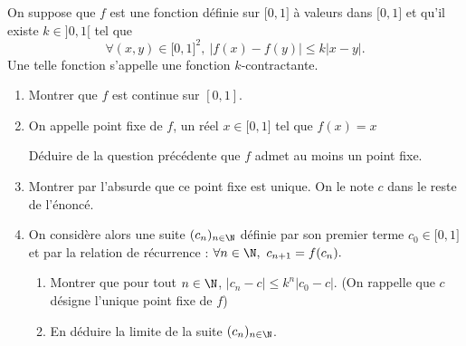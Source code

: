 \documentclass[a4paper, 11pt,reqno]{article}
\begin{document}
\vspace{1.5cm}





\begin{exercice}  \;
\noindent On suppose que $f$ est une fonction d\'efinie sur $\lbrack 0,1\rbrack$ \`a valeurs dans $\lbrack 0,1\rbrack$ et qu'il existe $k\in\rbrack 0,1\lbrack$ tel que
$$\forall (x,y)\in\lbrack 0,1\rbrack^2,\ |f(x)-f(y)|\leq k|x-y|.$$
Une telle fonction s'appelle une fonction $k$-contractante.
\begin{enumerate}
\item Montrer que $f$ est continue sur $[0,1]$. 
\item On appelle point fixe de  $f$,  un réel  $x \in \lbrack 0,1\rbrack$ tel que 
$f(x)=x$

Déduire de la question précédente que  $f$ admet au moins un point fixe.

\item Montrer par l'absurde que ce point fixe est unique. On le note $c$ dans le reste de l'énoncé.  

\item 
On consid\`ere alors une suite $(c_n)_{n\in\N}$ d\'efinie par son premier terme $c_0\in\lbrack 0,1\rbrack$ et par la relation de r\'ecurrence  : $\forall n\in\N,\ c_{n+1}=f(c_n).$
\begin{enumerate}
\item Montrer que pour tout $n\in\N$, $|c_n-c|\leq k^n|c_0-c|$.  (On rappelle que $c$ désigne l'unique point fixe de $f$)
\item En d\'eduire la limite de la suite $(c_n)_{n\in\N}$.
\end{enumerate}
\end{enumerate}
\end{exercice}
\end{document}
